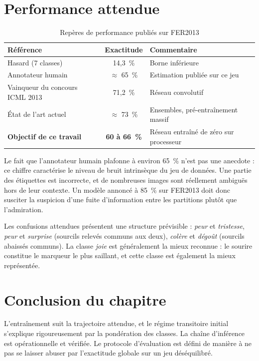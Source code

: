 \documentclass[a4paper,12pt]{report}
\begin{document}
\section{Performance attendue}
\label{sec:plafond}

\begin{table}[htbp]
\centering
\caption{Repères de performance publiés sur FER2013}
\begin{tabular}{|l|c|p{5.5cm}|}
\hline
\textbf{Référence} & \textbf{Exactitude} & \textbf{Commentaire} \\
\hline
Hasard (7 classes) & 14{,}3~\% & Borne inférieure \\
Annotateur humain & $\approx$ 65~\% & Estimation publiée sur ce jeu \\
Vainqueur du concours ICML 2013 & 71{,}2~\% & Réseau convolutif \\
État de l'art actuel & $\approx$ 73~\% & Ensembles, pré-entraînement massif \\
\hline
\textbf{Objectif de ce travail} & \textbf{60 à 66~\%} & Réseau entraîné de zéro sur processeur \\
\hline
\end{tabular}
\end{table}

Le fait que l'annotateur humain plafonne à environ 65~\% n'est pas une anecdote :
ce chiffre caractérise le niveau de bruit intrinsèque du jeu de données. Une
partie des étiquettes est incorrecte, et de nombreuses images sont réellement
ambiguës hors de leur contexte. Un modèle annoncé à 85~\% sur FER2013 doit donc
susciter la suspicion d'une fuite d'information entre les partitions plutôt que
l'admiration.

Les confusions attendues présentent une structure prévisible :
\emph{peur} et \emph{tristesse}, \emph{peur} et \emph{surprise} (sourcils
relevés communs aux deux), \emph{colère} et \emph{dégoût} (sourcils abaissés
communs). La classe \emph{joie} est généralement la mieux reconnue : le sourire
constitue le marqueur le plus saillant, et cette classe est également la mieux
représentée.

\section*{Conclusion du chapitre}
L'entraînement suit la trajectoire attendue, et le régime transitoire initial
s'explique rigoureusement par la pondération des classes. La chaîne d'inférence
est opérationnelle et vérifiée. Le protocole d'évaluation est défini de manière
à ne pas se laisser abuser par l'exactitude globale sur un jeu déséquilibré.
\end{document}
